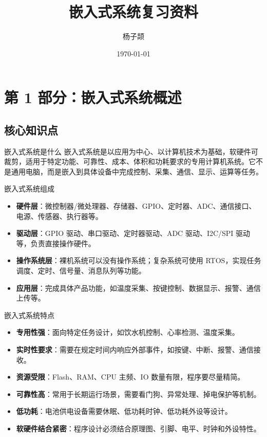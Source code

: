 \documentclass[UTF8,fontset=none,12pt]{ctexart}
\title{\bfseries 嵌入式系统复习资料}
\author{杨子颉}
\date{\today}
\begin{document}
\maketitle
\tableofcontents
\section{第 1 部分：嵌入式系统概述}

\subsection{核心知识点}
\begin{pointbox}{嵌入式系统是什么}
嵌入式系统是以应用为中心、以计算机技术为基础，软硬件可裁剪，适用于特定功能、可靠性、成本、体积和功耗要求的专用计算机系统。它不是通用电脑，而是嵌入到具体设备中完成控制、采集、通信、显示、运算等任务。
\end{pointbox}

\begin{pointbox}{嵌入式系统组成}
\begin{itemize}
  \item \textbf{硬件层}：微控制器/微处理器、存储器、GPIO、定时器、ADC、通信接口、电源、传感器、执行器等。
  \item \textbf{驱动层}：GPIO 驱动、串口驱动、定时器驱动、ADC 驱动、I2C/SPI 驱动等，负责直接操作硬件。
  \item \textbf{操作系统层}：裸机系统可以没有操作系统；复杂系统可使用 RTOS，实现任务调度、定时、信号量、消息队列等功能。
  \item \textbf{应用层}：完成具体产品功能，如温度采集、按键控制、数据显示、报警、通信上传等。
\end{itemize}
\end{pointbox}

\begin{pointbox}{嵌入式系统特点}
\begin{itemize}
  \item \textbf{专用性强}：面向特定任务设计，如饮水机控制、心率检测、温度采集。
  \item \textbf{实时性要求}：需要在规定时间内响应外部事件，如按键、中断、报警、通信接收。
  \item \textbf{资源受限}：Flash、RAM、CPU 主频、IO 数量有限，程序要尽量精简。
  \item \textbf{可靠性高}：常用于长期运行场景，需要看门狗、异常处理、掉电保护等机制。
  \item \textbf{低功耗}：电池供电设备需要休眠、低功耗时钟、低功耗外设等设计。
  \item \textbf{软硬件结合紧密}：程序设计必须结合原理图、引脚、电平、时钟和外设特性。
\end{itemize}
\end{pointbox}
\end{document}
